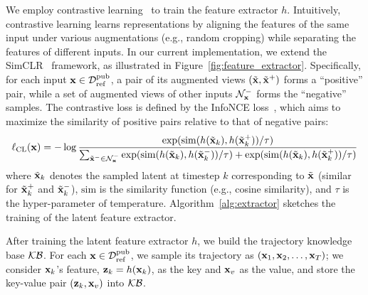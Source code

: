 We employ contrastive learning~\citep{chen2020simple,chen2020improved} to train the feature extractor $h$. Intuitively, contrastive learning learns representations by aligning the features of the same input under various augmentations (e.g., random cropping) while separating the features of different inputs. In our current implementation, we extend the SimCLR~\citep{chen2020simple} framework, as illustrated in Figure~\ref{fig:feature_extractor}. Specifically, for each input ${\mathbf{x}} \in {\mathcal{D}}^\mathrm{pub}_\mathrm{ref}$, a pair of its augmented views $(\tilde{{\mathbf{x}}}, \tilde{{\mathbf{x}}}^+)$ forms a ``positive'' pair, while a set of augmented views of other inputs ${\mathcal{N}}_{\mathbf{x}}^-$ forms the ``negative'' samples. The contrastive loss is defined by the InfoNCE loss~\citep{oord2018representation}, which aims to maximize the similarity of positive pairs relative to that of negative pairs:
\begin{equation}
\label{eq:cl}
\ell_\mathrm{CL}({\mathbf{x}}) = -  \log  \frac{\exp(\mathrm{sim}(h(\tilde{{\mathbf{x}}}_k), h(\tilde{{\mathbf{x}}}_k^+)) / \tau)}{\sum_{\tilde{{\mathbf{x}}}^- \in {\mathcal{N}}_{\mathbf{x}}^-}  \exp(\mathrm{sim}(h(\tilde{{\mathbf{x}}}_k), h(\tilde{{\mathbf{x}}}_k^-))/\tau) + \exp(\mathrm{sim}(h(\tilde{{\mathbf{x}}}_k), h(\tilde{{\mathbf{x}}}_k^+)) / \tau)}
\end{equation}
where $\tilde{{\mathbf{x}}}_k$ denotes the sampled latent at timestep $k$ corresponding to $\tilde{{\mathbf{x}}}$ (similar for $\tilde{{\mathbf{x}}}_k^+$ and $\tilde{{\mathbf{x}}}_k^-$), $\mathrm{sim}$ is the similarity function (e.g., cosine similarity), and $\tau$ is the hyper-parameter of temperature. Algorithm~\ref{alg:extractor} sketches the training of the latent feature extractor. 



After training the latent feature extractor $h$, we build the trajectory knowledge base ${\mathcal{K}}{\mathcal{B}}$. For each ${\mathbf{x}} \in {\mathcal{D}}^\mathrm{pub}_\mathrm{ref}$, we sample its trajectory as $({\mathbf{x}}_1, {\mathbf{x}}_{2}, \ldots, {\mathbf{x}}_T)$; we consider ${\mathbf{x}}_k$'s feature, ${\mathbf{z}}_k = h({\mathbf{x}}_k)$, as the key and ${\mathbf{x}}_v$ as the value, and store the key-value pair $({\mathbf{z}}_k, {\mathbf{x}}_v)$ into ${\mathcal{K}}{\mathcal{B}}$. 




